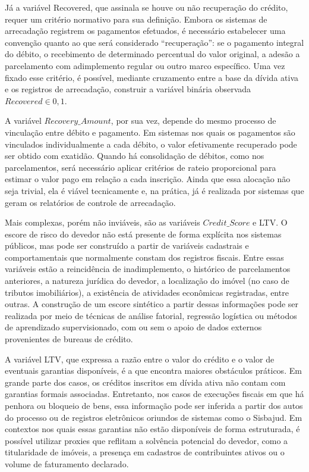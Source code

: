 \documentclass[a4paper,12pt]{article}
\begin{document}
Já a variável Recovered, que assinala se houve ou não recuperação do crédito, requer um critério normativo para sua definição. Embora os sistemas de arrecadação registrem os pagamentos efetuados, é necessário estabelecer uma convenção quanto ao que será considerado “recuperação”: se o pagamento integral do débito, o recebimento de determinado percentual do valor original, a adesão a parcelamento com adimplemento regular ou outro marco específico. Uma vez fixado esse critério, é possível, mediante cruzamento entre a base da dívida ativa e os registros de arrecadação, construir a variável binária observada 
$Recovered \in {0,1}$.

A variável $Recovery\_Amount$, por sua vez, depende do mesmo processo de vinculação entre débito e pagamento. Em sistemas nos quais os pagamentos são vinculados individualmente a cada débito, o valor efetivamente recuperado pode ser obtido com exatidão. Quando há consolidação de débitos, como nos parcelamentos, será necessário aplicar critérios de rateio proporcional para estimar o valor pago em relação a cada inscrição. Ainda que essa alocação não seja trivial, ela é viável tecnicamente e, na prática, já é realizada por sistemas que geram os relatórios de controle de arrecadação.

Mais complexas, porém não inviáveis, são as variáveis $Credit\_Score$ e LTV. O escore de risco do devedor não está presente de forma explícita nos sistemas públicos, mas pode ser construído a partir de variáveis cadastrais e comportamentais que normalmente constam dos registros fiscais. Entre essas variáveis estão a reincidência de inadimplemento, o histórico de parcelamentos anteriores, a natureza jurídica do devedor, a localização do imóvel (no caso de tributos imobiliários), a existência de atividades econômicas registradas, entre outras. A construção de um escore sintético a partir dessas informações pode ser realizada por meio de técnicas de análise fatorial, regressão logística ou métodos de aprendizado supervisionado, com ou sem o apoio de dados externos provenientes de bureaus de crédito.

A variável LTV, que expressa a razão entre o valor do crédito e o valor de eventuais garantias disponíveis, é a que encontra maiores obstáculos práticos. Em grande parte dos casos, os créditos inscritos em dívida ativa não contam com garantias formais associadas. Entretanto, nos casos de execuções fiscais em que há penhora ou bloqueio de bens, essa informação pode ser inferida a partir dos autos do processo ou de registros eletrônicos oriundos de sistemas como o Sisbajud. Em contextos nos quais essas garantias não estão disponíveis de forma estruturada, é possível utilizar proxies que reflitam a solvência potencial do devedor, como a titularidade de imóveis, a presença em cadastros de contribuintes ativos ou o volume de faturamento declarado.
\end{document}
